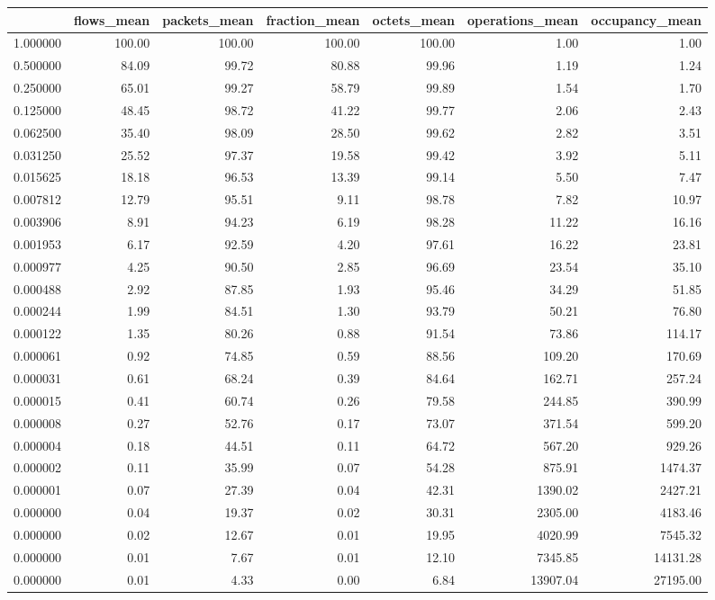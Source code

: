 \begin{tabular}{lrrrrrr}
\toprule
 & flows_mean & packets_mean & fraction_mean & octets_mean & operations_mean & occupancy_mean \\
\midrule
1.000000 & 100.00 & 100.00 & 100.00 & 100.00 & 1.00 & 1.00 \\
0.500000 & 84.09 & 99.72 & 80.88 & 99.96 & 1.19 & 1.24 \\
0.250000 & 65.01 & 99.27 & 58.79 & 99.89 & 1.54 & 1.70 \\
0.125000 & 48.45 & 98.72 & 41.22 & 99.77 & 2.06 & 2.43 \\
0.062500 & 35.40 & 98.09 & 28.50 & 99.62 & 2.82 & 3.51 \\
0.031250 & 25.52 & 97.37 & 19.58 & 99.42 & 3.92 & 5.11 \\
0.015625 & 18.18 & 96.53 & 13.39 & 99.14 & 5.50 & 7.47 \\
0.007812 & 12.79 & 95.51 & 9.11 & 98.78 & 7.82 & 10.97 \\
0.003906 & 8.91 & 94.23 & 6.19 & 98.28 & 11.22 & 16.16 \\
0.001953 & 6.17 & 92.59 & 4.20 & 97.61 & 16.22 & 23.81 \\
0.000977 & 4.25 & 90.50 & 2.85 & 96.69 & 23.54 & 35.10 \\
0.000488 & 2.92 & 87.85 & 1.93 & 95.46 & 34.29 & 51.85 \\
0.000244 & 1.99 & 84.51 & 1.30 & 93.79 & 50.21 & 76.80 \\
0.000122 & 1.35 & 80.26 & 0.88 & 91.54 & 73.86 & 114.17 \\
0.000061 & 0.92 & 74.85 & 0.59 & 88.56 & 109.20 & 170.69 \\
0.000031 & 0.61 & 68.24 & 0.39 & 84.64 & 162.71 & 257.24 \\
0.000015 & 0.41 & 60.74 & 0.26 & 79.58 & 244.85 & 390.99 \\
0.000008 & 0.27 & 52.76 & 0.17 & 73.07 & 371.54 & 599.20 \\
0.000004 & 0.18 & 44.51 & 0.11 & 64.72 & 567.20 & 929.26 \\
0.000002 & 0.11 & 35.99 & 0.07 & 54.28 & 875.91 & 1474.37 \\
0.000001 & 0.07 & 27.39 & 0.04 & 42.31 & 1390.02 & 2427.21 \\
0.000000 & 0.04 & 19.37 & 0.02 & 30.31 & 2305.00 & 4183.46 \\
0.000000 & 0.02 & 12.67 & 0.01 & 19.95 & 4020.99 & 7545.32 \\
0.000000 & 0.01 & 7.67 & 0.01 & 12.10 & 7345.85 & 14131.28 \\
0.000000 & 0.01 & 4.33 & 0.00 & 6.84 & 13907.04 & 27195.00 \\
\bottomrule
\end{tabular}

